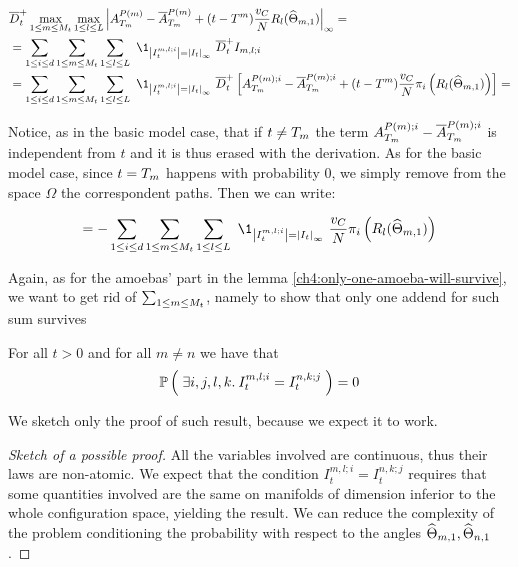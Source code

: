 \begin{align*}
	&\diniu_t^+
	\max_{1\leq m \leq \hmactive_t}	
	\max_{1\leq l \leq \NumCampRelease}
	\norm{
		\amba_{\btime_{m}}^{\Parentof(m)} 
		- \mfamba_{\btime_{m}}^{\Parentof(m)}
		+ (t - \btime^{m}) \frac{\cdrift}{N}  \rotation_l (\cgonia_{m,1})
	}_\infty=
	\\
	&=
	\sum_{1\leq i \leq d}
	\sum_{1\leq m \leq \hmactive_t}
	\sum_{1\leq l \leq \NumCampRelease}\
	\1_{
		\norm{I^{m,l;i}_t} = \norm{I_t}_\infty
		}\
	\diniu_t^+
	I_{m,l;i}
	\\
	&=
	\sum_{1\leq i \leq d}
	\sum_{1\leq m \leq \hmactive_t}
	\sum_{1\leq l \leq \NumCampRelease}\
	\1_{
		\norm{I^{m,l;i}_t} = \norm{I_t}_\infty
	}\
	\diniu_t^+
	\left[
	\amba_{\btime_{m}}^{\Parentof(m);i} 
	- \mfamba_{\btime_{m}}^{\Parentof(m);i} 
	+ (t - \btime^{m}) \frac{\cdrift}{N}  \pi_i \left(\rotation_l (\cgonia_{m,1}) \right)
	\right]
	=
\end{align*}

Notice, as in the basic model case, that if $t\neq T_m$ the term $A_{T_{m}}^{P(m);i} 
- \overline{A}_{T_{m}}^{P(m);i} $ is independent from $t$ and it is thus erased with the derivation.
As for the basic model case, since $t= T_m$ happens with probability $0$, we simply remove from the space $\Omega$ the correspondent paths.
Then we can write:

\begin{equation*}
	=
	-
	\sum_{1\leq i \leq d}
	\sum_{1\leq m \leq \hmactive_t}
	\sum_{1\leq l \leq \NumCampRelease}\	
	\1_{
		\norm{I^{m,l;i}_t} = \norm{I_t}_\infty
	}\
	\frac{\cdrift}{N}  \pi_i \left(\rotation_l (\cgonia_{m,1}) \right)
\end{equation*}

Again, as for the amoebas' part in the lemma \ref{ch4:only-one-amoeba-will-survive}, we want to get rid of $\sum_{1\leq m \leq M_t}$,  namely to show that only one addend for such sum survives \ie

\begin{lemma}\label{ch7:only-one-camp-will-survive}
	For all $t>0$ and for all $m \neq n$ we have that 
	\begin{equation*}
		\mathbb{P} \left( \; 
			\exists i,j,l,k.\:
			I^{m,l;i}_t
			=
			I^{n,k;j}_t
		 \; \right) = 0
	\end{equation*}
\end{lemma}

We sketch only the proof of such result, because we expect it to work.

\begin{proof}[Sketch of a possible proof]
	All the variables involved are continuous, thus their laws are non-atomic.
	We expect that the condition $I^{m,l;i}_t
	=
	I^{n,k;j}_t$ requires that some quantities involved are the same on manifolds of dimension inferior to the whole configuration space, yielding the result.
	We can reduce the complexity of the problem conditioning the probability with respect to the angles $\widehat{\Theta}_{m,1}, \widehat{\Theta}_{n,1}$.
\end{proof}

